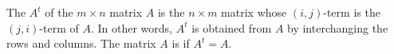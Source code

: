 The  $A^t$ of the $m \times n$ matrix $A$ is the $n \times m$ matrix whose $(i, j)$-term is the $(j, i)$-term of $A$. In other words, $A^t$ is obtained from $A$ by interchanging the rows and columns. The matrix $A$ is  if $A^t = A$.
